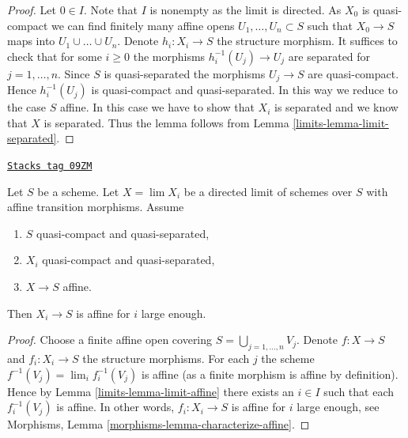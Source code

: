 \begin{proof}

Let $0 \in I$. Note that $I$ is nonempty as the limit is directed.
As $X_0$ is quasi-compact we can find finitely many
affine opens $U_1, \ldots, U_n \subset S$ such that
$X_0 \to S$ maps into $U_1 \cup \ldots \cup U_n$.
Denote $h_i : X_i \to S$ the structure morphism.
It suffices to check that for some $i \geq 0$ the morphisms
$h_i^{-1}(U_j) \to U_j$ are separated for $j = 1, \ldots,  n$.
Since $S$ is quasi-separated the morphisms $U_j \to S$ are quasi-compact.
Hence $h_i^{-1}(U_j)$ is quasi-compact and quasi-separated.
In this way we reduce to the case $S$ affine. In this case we
have to show that $X_i$ is separated and we know that $X$ is separated.
Thus the lemma follows from Lemma \ref{limits-lemma-limit-separated}.
\end{proof}

\begin{lemma}
\label{limits-lemma-eventually-affine}
\href{https://stacks.math.columbia.edu/tag/09ZM}{\texttt{Stacks tag 09ZM}}

Let $S$ be a scheme. Let $X = \lim X_i$ be a directed limit of schemes
over $S$ with affine transition morphisms. Assume
\begin{enumerate}
\item $S$ quasi-compact and quasi-separated,
\item $X_i$ quasi-compact and quasi-separated,
\item $X \to S$ affine.
\end{enumerate}
Then $X_i \to S$ is affine for $i$ large enough.
\end{lemma}

\begin{proof}

Choose a finite affine open covering $S = \bigcup_{j = 1, \ldots, n} V_j$.
Denote $f : X \to S$ and $f_i : X_i \to S$ the structure morphisms.
For each $j$ the scheme $f^{-1}(V_j) = \lim_i f_i^{-1}(V_j)$
is affine (as a finite morphism is affine by definition). Hence by
Lemma \ref{limits-lemma-limit-affine} there exists an $i \in I$ such that
each $f_i^{-1}(V_j)$ is affine. In other words, $f_i : X_i \to S$ is
affine for $i$ large enough, see
Morphisms, Lemma \ref{morphisms-lemma-characterize-affine}.
\end{proof}

